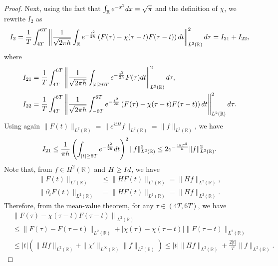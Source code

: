 \documentclass[a4paper,reqno]{amsart}
\theoremstyle{definition}
\numberwithin{equation}{section}
\newcommand{\R}{\mathbb{R}}
\def \R {{\mathbb{R} }}
\def \d {{\rm{d}}}
\def \pt{\partial_{t}}
\begin{document}
\begin{proof}
        Next, using the fact that $\int_{\R}e^{-x^{2}}\d x=\sqrt{\pi}$ and the definition of $\chi$, we rewrite $I_{2}$ as 
        \begin{equation*}
            I_{2}=\frac{1}{T}\int_{4T}^{6T}\left\|
            \frac{1}{\sqrt{2\pi h}}\int_{\R}e^{-\frac{t^{2}}{2h}}\left(F(\tau)-\chi(\tau-t)F(\tau-t)\right)\d t    \right\|_{L^{2}(\R)}^{2}\d \tau=I_{21}+I_{22},        
    \end{equation*}
    where 
    \begin{equation*}
        \begin{aligned}
            I_{21}&=\frac{1}{T}\int_{4T}^{6T}\left\|
            \frac{1}{\sqrt{2\pi h}}\int_{|t|\ge 6T}e^{-\frac{t^{2}}{2h}}F(\tau)\d t    \right\|_{L^{2}(\R)}^{2}\d \tau,\\
            I_{22}&=\frac{1}{T}\int_{4T}^{6T}\left\|
            \frac{1}{\sqrt{2\pi h}}\int_{-6T}^{6T}e^{-\frac{t^{2}}{2h}}\left(F(\tau)-\chi(\tau-t)F(\tau-t)\right)\d t    \right\|_{L^{2}(\R)}^{2}\d \tau.
            \end{aligned}
    \end{equation*}
    Using again $\|F(t)\|_{L^{2}(\R)}=\|e^{itH}f\|_{L^{2}(\R)}=\|f\|_{L^{2}(\R)}$, we have 
    \begin{equation*}
        I_{21}\le \frac{1}{\pi h}\left(\int_{|t|\ge 6T}e^{-\frac{t^{2}}{2h}}\d t\right)^{2}\|f\|_{L^{2}(\R)}^{2}
        \le 2 e^{-\frac{18T^{2}}{h}}\|f\|_{L^{2}(\R)}^{2}.
    \end{equation*}
    Note that, from $f\in H^{2}(\R)$ and $H\ge \rm{Id}$, we have 
    \begin{equation*}
    \begin{aligned}
        \|F(t)\|_{L^{2}(\R)}&\le \|HF(t)\|_{L^{2}(\R)}=\|Hf\|_{L^{2}(\R)},\\
         \|\pt F(t)\|_{L^{2}(\R)}&=\|HF(t)\|_{L^{2}(\R)}=\|Hf\|_{L^{2}(\R)}.
         \end{aligned}
        \end{equation*}
        Therefore, from the mean-value theorem, for any $\tau\in (4T,6T)$, we have 
        \begin{equation*}
        \begin{aligned}
        &\left\|F(\tau)-\chi(\tau-t)F(\tau-t)\right\|_{L^{2}(\R)}\\
        &\le \|F(\tau)-F(\tau-t)\|_{L^{2}(\R)}+|\chi(\tau)-\chi(\tau-t)|\|F(\tau-t)\|_{L^{2}(\R)}\\
        &\le |t|\left(\|Hf\|_{L^{2}(\R)}+\|\chi'\|_{L^{\infty}(\R)}\|f\|_{L^{2}(\R)}\right)\le |t|\|Hf\|_{L^2(\R)} +\frac{2|t|}{T}\|f\|_{L^2(\R)}  .

\end{aligned}
\end{equation*}
\end{proof}
\end{document}
